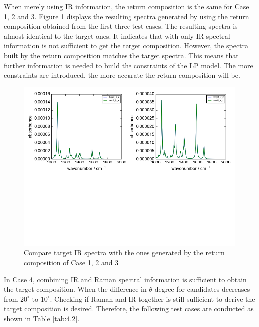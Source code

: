 When merely using IR information, the return composition is the same for Case 1, 2 and 3. Figure \ref{fig:4.1} displays the resulting spectra generated by using the return composition obtained from the first three test cases. The resulting spectra is almost identical to the target ones. It indicates that with only IR spectral information is not sufficient to get the target composition.  However, the spectra built by the return composition matches the target spectra. This means that further information is needed to build the constraints of the LP model. The more constraints are introduced, the more accurate the return composition will be. \\

\begin{figure}[!ht]
\centering
\includegraphics[scale=0.7]{Figures/ir_xz_result_plotting.png}
\caption{Compare target IR spectra with the ones generated by the return composition of Case 1, 2 and 3}  \label{fig:4.1}
\end{figure}

In Case 4, combining IR and Raman spectral information is sufficient to obtain the target composition. When the difference in $\theta$ degree for candidates decreases from $20^{\circ}$ to $10^{\circ}$. Checking if Raman and IR together is still sufficient to derive the target composition is desired. Therefore, the following test cases are conducted as shown in Table \ref{tab:4.2}. \\

